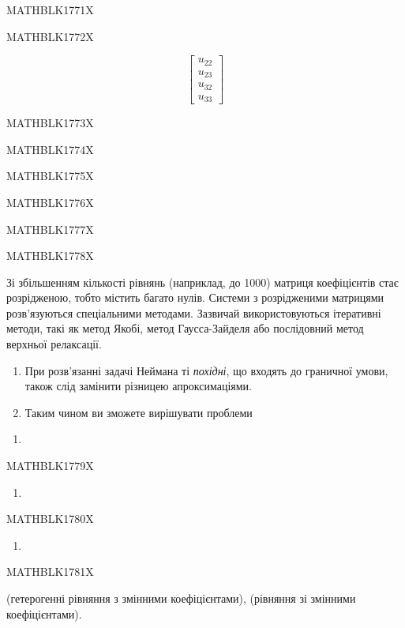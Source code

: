 \documentclass[
  ukrainian,
]{article}
\providecommand{\tightlist}{%
  \setlength{\itemsep}{0pt}\setlength{\parskip}{0pt}}
\begin{document}
MATHBLK1771X

MATHBLK1772X

\[
\begin{bmatrix} u_{22} \\ u_{23} \\ u_{32} \\ u_{33} \end{bmatrix}
\]

MATHBLK1773X

MATHBLK1774X

MATHBLK1775X

MATHBLK1776X

MATHBLK1777X

MATHBLK1778X

Зі збільшенням кількості рівнянь (наприклад, до 1000) матриця
коефіцієнтів стає розрідженою, тобто містить багато нулів. Системи з
розрідженими матрицями розв'язуються спеціальними методами. Зазвичай
використовуються ітеративні методи, такі як метод Якобі, метод
Гаусса-Зайделя або послідовний метод верхньої релаксації.

\begin{enumerate}
\def\labelenumi{\arabic{enumi}.}
\setcounter{enumi}{3}
\item
  При розв'язанні задачі Неймана ті \emph{похідні}, що входять до
  граничної умови, також слід замінити різницею апроксимаціями.
\item
  Таким чином ви зможете вирішувати проблеми
\end{enumerate}

\begin{enumerate}
\def\labelenumi{\alph{enumi})}
\tightlist
\item
\end{enumerate}

MATHBLK1779X

\begin{enumerate}
\def\labelenumi{\arabic{enumi})}
\setcounter{enumi}{5}
\tightlist
\item
\end{enumerate}

MATHBLK1780X

\begin{enumerate}
\def\labelenumi{\Alph{enumi})}
\setcounter{enumi}{1}
\tightlist
\item
\end{enumerate}

MATHBLK1781X

(гетерогенні рівняння з змінними коефіцієнтами), (рівняння зі змінними
коефіцієнтами).
\end{document}

